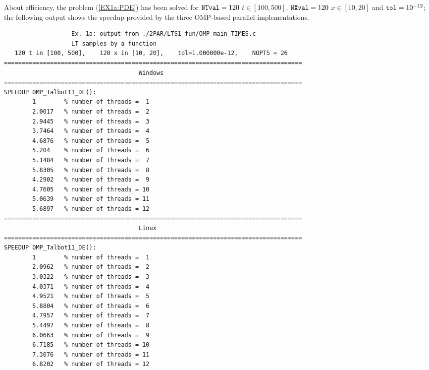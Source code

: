 \documentclass[a4paper,10pt]{report}%
\begin{document}
About efficiency, the problem (\ref{EX1a:PDE}) has been solved for ${\tt NTval}=120$ $t\in[100,500]$, ${\tt NXval}=120$
$x\in[10,20]$ and ${\tt tol}=10^{-12}$; the following output shows the speedup provided by the three OMP-based
parallel implementations.
\begin{lstlisting}
                   Ex. 1a: output from ./2PAR/LTS1_fun/OMP_main_TIMES.c
                   LT samples by a function
   120 t in [100, 500],    120 x in [10, 20],    tol=1.000000e-12,    NOPTS = 26
====================================================================================
                                      Windows
====================================================================================
SPEEDUP OMP_Talbot11_DE():
        1        % number of threads =  1
        2.0017   % number of threads =  2
        2.9445   % number of threads =  3
        3.7464   % number of threads =  4
        4.6876   % number of threads =  5
        5.204    % number of threads =  6
        5.1484   % number of threads =  7
        5.8305   % number of threads =  8
        4.2902   % number of threads =  9
        4.7605   % number of threads = 10
        5.0639   % number of threads = 11
        5.6897   % number of threads = 12
====================================================================================
                                      Linux
====================================================================================
SPEEDUP OMP_Talbot11_DE():
        1        % number of threads =  1
        2.0962   % number of threads =  2
        3.0322   % number of threads =  3
        4.0371   % number of threads =  4
        4.9521   % number of threads =  5
        5.8804   % number of threads =  6
        4.7957   % number of threads =  7
        5.4497   % number of threads =  8
        6.0663   % number of threads =  9
        6.7185   % number of threads = 10
        7.3076   % number of threads = 11
        6.8202   % number of threads = 12


\end{lstlisting}
\end{document}
